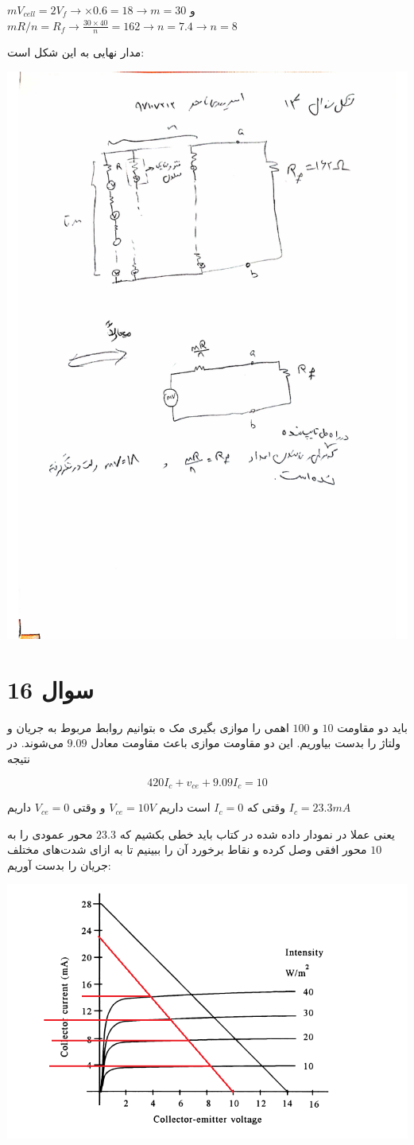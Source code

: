 \documentclass[12pt]{article}
\begin{document}
$mV_{cell} = 2 V_f \rightarrow \times 0.6 = 18 \rightarrow m = 30$
و
$mR/n = R_f \rightarrow \frac{30 \times 40}{n} = 162 \rightarrow n=7.4 \rightarrow n=8$ 

مدار نهایی به این شکل است:


\begin{center}
	\includegraphics[width = 0.5 \textwidth]{images/12.pdf}
\end{center}
\newpage

\section*{سوال 16}



باید دو مقاومت $10$ و $100$ اهمی را موازی بگیری مک ه بتوانیم روابط مربوط به جریان و ولتاژ را بدست بیاوریم. این دو مقاومت موازی باعث مقاومت معادل $9.09$ می‌شوند. در نتیجه

$$420 I_c + v_{ce} + 9.09 I_c = 10$$

وقتی که $I_c=0$ است داریم
 $V_{ce} =10V$ و وقتی
$V_{ce} = 0$
داریم $I_c = 23.3mA$

یعنی عملا در نمودار داده شده در کتاب باید خطی بکشیم که $23.3$ محور عمودی را به $10$ محور افقی وصل کرده و نقاط برخورد آن را ببینیم تا به ازای شدت‌های مختلف جریان را بدست آوریم:


\begin{center}
	\includegraphics[width = 0.5 \textwidth]{images/16.png}
\end{center}
\end{document}
